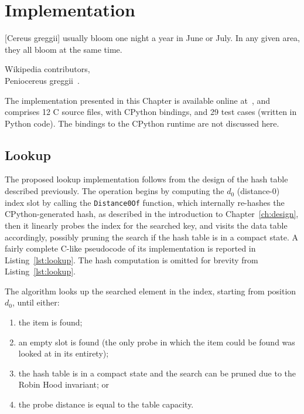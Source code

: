 \chapter{Implementation}\label{ch:implementation}

\epigraph{%
    [Cereus greggii] usually bloom one night a year in June or July.
    In any given area, they all bloom at the same time.
}{Wikipedia contributors,\\Peniocereus greggii~\cite{peniocereus-greggii}.}

The implementation presented in this Chapter is available online at~\cite[src/cereggii/atomic\_dict]{cereggii}, and comprises 12 C source files, with CPython bindings, and 29 test cases (written in Python code).
The bindings to the CPython runtime are not discussed here.


\section{Lookup}\label{sec:lookup}

The proposed lookup implementation follows from the design of the hash table described previously.
The operation begins by computing the $d_0$ (distance-0) index slot by calling the \texttt{Distance0Of} function, which internally re-hashes the CPython-generated hash, as described in the introduction to Chapter~\ref{ch:design}, then it linearly probes the index for the searched key, and visits the data table accordingly, possibly pruning the search if the hash table is in a compact state.
A fairly complete C-like pseudocode of its implementation is reported in Listing~\ref{lst:lookup}.
The hash computation is omitted for brevity from Listing~\ref{lst:lookup}.

The algorithm looks up the searched element in the index, starting from position $d_0$, until either:
\begin{enumerate}
    \item the item is found;
    \item an empty slot is found (the only probe in which the item could be found was looked at in its entirety);
    \item the hash table is in a compact state and the search can be pruned due to the Robin Hood invariant; or
    \item the probe distance is equal to the table capacity.
\end{enumerate}

